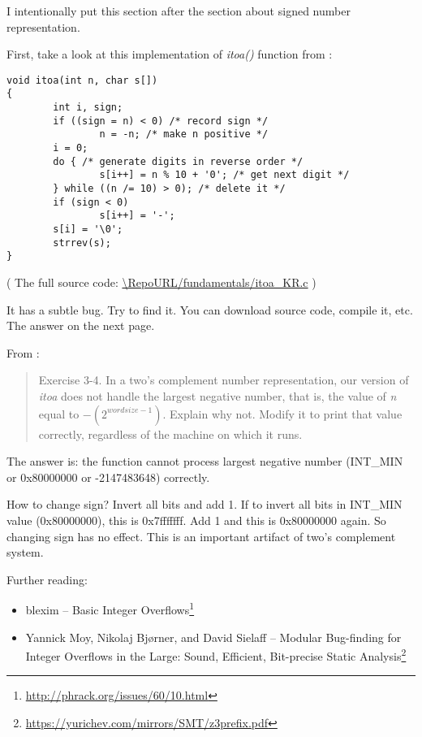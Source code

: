 
I intentionally put this section after the section about signed number representation.

First, take a look at this implementation of \emph{itoa()} function from \InSqBrackets{\KRBook}:

\begin{lstlisting}[style=customc]
void itoa(int n, char s[])
{
        int i, sign;
        if ((sign = n) < 0) /* record sign */
                n = -n; /* make n positive */
        i = 0;
        do { /* generate digits in reverse order */
                s[i++] = n % 10 + '0'; /* get next digit */
        } while ((n /= 10) > 0); /* delete it */
        if (sign < 0)
                s[i++] = '-';
        s[i] = '\0';
        strrev(s);
}
\end{lstlisting}

( The full source code: \url{\RepoURL/fundamentals/itoa_KR.c} )

It has a subtle bug. Try to find it. You can download source code, compile it, etc.
The answer on the next page.

\clearpage

From \InSqBrackets{\KRBook}:

\begin{framed}
\begin{quotation}
Exercise 3-4. In a two's complement number representation, our version of \emph{itoa}
does not handle the largest negative number, that is, the value
of \emph{n} equal to $-(2^{wordsize-1})$. Explain why not. Modify it to
print that value correctly, regardless of the machine on which
it runs.
\end{quotation}
\end{framed}

The answer is: the function cannot process largest negative number (INT\_MIN or 0x80000000 or -2147483648) correctly.

How to change sign? Invert all bits and add 1.
If to invert all bits in INT\_MIN value (0x80000000), this is 0x7fffffff. Add 1 and this is 0x80000000 again.
So changing sign has no effect.
This is an important artifact of two's complement system.

Further reading:

\begin{itemize}
\item blexim -- Basic Integer Overflows\footnote{\url{http://phrack.org/issues/60/10.html}}

\item Yannick Moy, Nikolaj Bjørner, and David Sielaff -- Modular Bug-finding for Integer Overflows in the Large: Sound, Efficient, Bit-precise Static Analysis\footnote{\url{https://yurichev.com/mirrors/SMT/z3prefix.pdf}}
\end{itemize}

